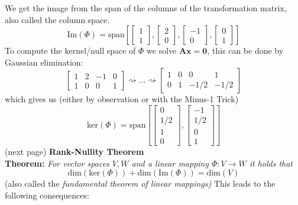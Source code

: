 \documentclass{report}
\begin{document}
We get the image from the span of the columns of the transformation matrix, also called the column space.
\begin{equation*}
\text{Im}(\Phi)=\text{span}[
\begin{bmatrix}1\\1\end{bmatrix},
\begin{bmatrix}2\\0\end{bmatrix},
\begin{bmatrix}-1\\0\end{bmatrix},
\begin{bmatrix}0\\1\end{bmatrix}]
\end{equation*}
To compute the kernel/null space of $\Phi$ we solve $\bm{Ax}=\mathbf{0}$, this can be done by Gaussian elimination:
\begin{equation*}
\begin{bmatrix*}
1&2&-1&0\\1&0&0&1
\end{bmatrix*}\rightsquigarrow\ldots\rightsquigarrow
\begin{bmatrix*}
1&0&0&1\\0&1&-1/2&-1/2
\end{bmatrix*}
\end{equation*}
which gives us (either by observation or with the Minus-1 Trick)
\begin{equation*}
\text{ker}(\Phi)=\text{span}[
\begin{bmatrix*}
0\\1/2\\1\\0
\end{bmatrix*},
\begin{bmatrix*}
-1\\1/2\\0\\1
\end{bmatrix*}]
\end{equation*}
(next page)
\newpage
\noindent\textbf{Rank-Nullity Theorem}\\
\textbf{Theorem:} \textit{For vector spaces $V,W$ and a linear mapping $\Phi:V\to W$ it 
holds that}
\begin{equation*}
\text{dim}(\text{ker}(\Phi))+\text{dim}(\text{Im}(\Phi))
=\text{dim}(V)
\end{equation*}
(also called the \textit{fundamental theorem of linear mappings)} This leads to the following consequences:
\end{document}

